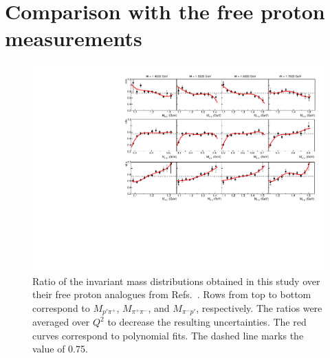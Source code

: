 \documentclass[prc,twocolumn,superscriptaddress,showpacs,amssymb,amsmath,amsfonts,aps,nofootinbib]{revtex4-1}
\begin{document}
\section{Comparison with the free proton measurements}
\label{Sect:with_fed_comp}



\begin{figure}[htp]
\begin{center}
\includegraphics[width=16.25cm]{pictures/fed_comp/mass_new.pdf}
\caption{\small Ratio of the invariant mass distributions obtained in this study over their free proton analogues from Refs.\!~\cite{Fed_an_note:2017,Fed_paper_2018}. Rows from top to bottom correspond to $M_{p'\pi^{+}}$, $M_{\pi^{+}\pi^{-}}$, and $M_{\pi^{-}p'}$, respectively. The ratios were averaged over $Q^{2}$ to decrease the resulting uncertainties. The red curves correspond to polynomial fits. The dashed line marks the value of 0.75.} \label{fig:fed_mass}
\end{center}
\end{figure}
\end{document}
